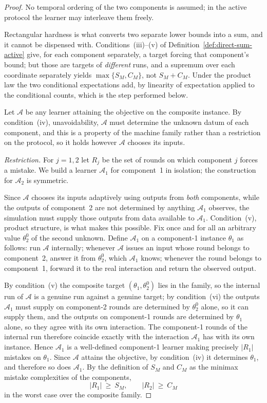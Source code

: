 \documentclass[12pt]{article}
\theoremstyle{definition}
\begin{document}
\begin{proof}
No temporal ordering of the two components is assumed; in the active protocol
the learner may interleave them freely.

Rectangular hardness is what converts two separate lower bounds into a sum, and
it cannot be dispensed with.  Conditions~(iii)--(v) of
Definition~\ref{def:direct-sum-active} give, for each component separately, a
target forcing that component's bound; but those are targets of \emph{different}
runs, and a supremum over each coordinate separately yields
$\max\{S_M,C_M\}$, not $S_M+C_M$.  Under the product law the two conditional
expectations add, by linearity of expectation applied to the conditional
counts, which is the step performed below.

Let $\mathcal A$ be any learner attaining the objective on the composite
instance.  By condition~(iv), unavoidability, $\mathcal A$ must determine the
unknown datum of each component, and this is a property of the machine family
rather than a restriction on the protocol, so it holds however $\mathcal A$
chooses its inputs.

\emph{Restriction.}  For $j=1,2$ let $R_j$ be the set of rounds on which
component $j$ forces a mistake.  We build a learner $\mathcal A_1$ for
component~1 in isolation; the construction for $\mathcal A_2$ is symmetric.

Since $\mathcal A$ chooses its inputs adaptively using outputs from
\emph{both} components, while the outputs of component~2 are not determined by
anything $\mathcal A_1$ observes, the simulation must supply those outputs from
data available to $\mathcal A_1$.  Condition~(v), product structure, is what
makes this possible.  Fix once and for all an arbitrary value $\theta_2^{0}$
of the second unknown.  Define $\mathcal A_1$ on a component-1 instance $\theta_1$ as
follows: run $\mathcal A$ internally; whenever $\mathcal A$ issues an input
whose round belongs to component~2, answer it from $\theta_2^{0}$, which
$\mathcal A_1$ knows; whenever the round belongs to component~1, forward it to
the real interaction and return the observed output.

By condition~(v) the composite target $(\theta_1,\theta_2^{0})$ lies in the
family, so the internal run of $\mathcal A$ is a genuine run against a genuine
target; by condition~(vi) the outputs $\mathcal A_1$ must supply on
component-2 rounds are determined by $\theta_2^{0}$ alone, so it can supply
them, and the outputs on component-1 rounds are determined by $\theta_1$ alone,
so they agree with its own interaction.  The component-1 rounds of the internal
run therefore coincide exactly with the interaction $\mathcal A_1$ has with its
own instance.  Hence $\mathcal A_1$ is
a well-defined component-1 learner making precisely $|R_1|$ mistakes on
$\theta_1$.  Since $\mathcal A$ attains the objective, by condition~(iv) it
determines $\theta_1$, and therefore so does $\mathcal A_1$.  By the definition
of $S_M$ and $C_M$ as the minimax mistake complexities of the components,
\[
|R_1|\ \ge\ S_M,
\qquad
|R_2|\ \ge\ C_M
\]
in the worst case over the composite family.


\end{proof}
\end{document}
